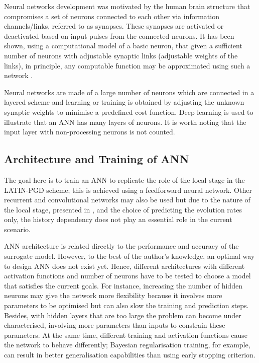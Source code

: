 Neural networks development was motivated by the human brain structure that compromises a set of neurons connected to each other via information channels/links, referred to as synapses. These synapses are activated or deactivated based on input pulses from the connected neurons. It has been shown, using a computational model of a basic neuron, that given a sufficient number of neurons with adjustable synaptic links (adjustable weights of the links), in principle, any computable function may be approximated using such a network \parencite{theodoridis}.

Neural networks are made of a large number of neurons which are connected in a layered scheme and learning or training is obtained by adjusting the unknown synaptic weights to minimise a predefined cost function. Deep learning is used to illustrate that an ANN has many layers of neurons. It is worth noting that the input layer with non-processing neurons is not counted.

\subsection{Architecture and Training of ANN}
The goal here is to train an ANN to replicate the role of the local stage in the LATIN-PGD scheme; this is achieved using a feedforward neural network. Other recurrent and convolutional networks may also be used but due to the nature of the local stage, presented in , and the choice of predicting the evolution rates only, the history dependency does not play an essential role in the current scenario.

ANN architecture is related directly to the performance and accuracy of the surrogate model. However, to the best of the author's knowledge, an optimal way to design ANN does not exist yet. Hence, different architectures with different activation functions and number of neurons have to be tested to choose a model that satisfies the current goals. For instance, increasing the number of hidden neurons may give the network more flexibility because it involves more parameters to be optimised but can also slow the training and prediction steps. Besides, with hidden layers that are too large the problem can become under characterised, involving more parameters than inputs to constrain these parameters. At the same time, different training and activation functions cause the network to behave differently; Bayesian regularisation training, for example, can result in better generalisation capabilities than using early stopping criterion.


